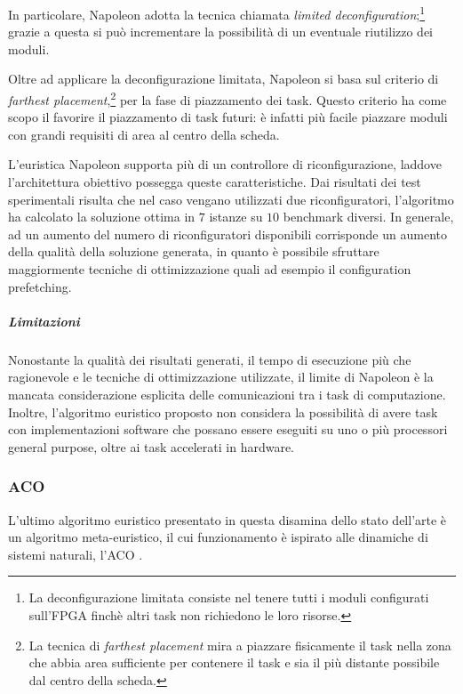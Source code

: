 In particolare, Napoleon adotta la tecnica chiamata \emph{limited 
deconfiguration};\footnote{La deconfigurazione limitata consiste nel tenere 
tutti i moduli configurati sull'\ac{FPGA} finchè altri task non richiedono le 
loro risorse.} grazie a questa si può incrementare la possibilità di 
un eventuale riutilizzo dei moduli.

Oltre ad applicare la deconfigurazione limitata, Napoleon si basa sul criterio 
di \emph{farthest placement},\footnote{La tecnica di \emph{farthest placement} 
mira a piazzare fisicamente il task nella zona che abbia area sufficiente per 
contenere il task e sia il più distante possibile dal centro della scheda.} per 
la fase di piazzamento dei task. Questo criterio ha come scopo il favorire il 
piazzamento di task futuri: è infatti più facile piazzare moduli con grandi 
requisiti di area al centro della scheda.

L'euristica Napoleon supporta più di un controllore di riconfigurazione, 
laddove l'architettura obiettivo possegga queste caratteristiche. Dai risultati 
dei test sperimentali risulta che nel caso vengano utilizzati due 
riconfiguratori, l'algoritmo ha calcolato la soluzione ottima in $7$ istanze su 
$10$ benchmark diversi. In generale, ad un aumento del numero di 
riconfiguratori disponibili corrisponde un aumento della qualità della 
soluzione generata, in quanto è possibile sfruttare maggiormente tecniche di 
ottimizzazione quali ad esempio il configuration prefetching.

\subparagraph{Limitazioni}
Nonostante la qualità dei risultati generati, il tempo di esecuzione più che 
ragionevole e le tecniche di ottimizzazione utilizzate, il limite di Napoleon è 
la mancata considerazione esplicita delle comunicazioni tra i task di 
computazione. Inoltre, l'algoritmo euristico proposto non considera la 
possibilità di avere task con implementazioni software che possano essere 
eseguiti su uno o più processori general purpose, oltre ai task accelerati in 
hardware.


\subsubsection{\acl{ACO}}
L'ultimo algoritmo euristico presentato in questa disamina dello stato 
dell'arte è un algoritmo meta-euristico, il cui funzionamento è ispirato alle 
dinamiche di sistemi naturali, l'\ac{ACO} \cite{AntSystem}. 




